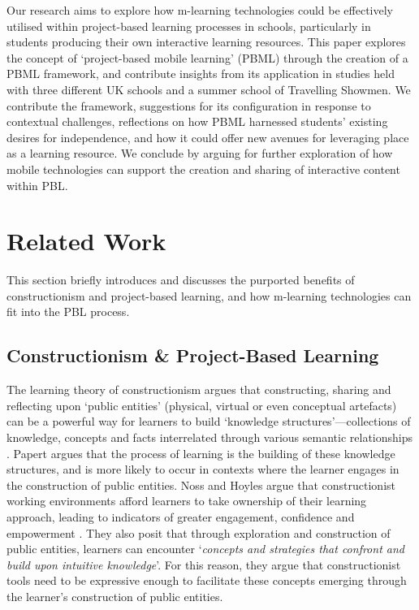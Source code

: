 \documentclass[,hyphens]{sigchi}
\begin{document}
Our research aims to explore how m-learning technologies could be effectively utilised within project-based learning processes in schools, particularly in students producing their own interactive learning resources. This paper explores the concept of `project-based mobile learning' (PBML) through the creation of a PBML framework, and contribute insights from its application in studies held with three different UK schools and a summer school of Travelling Showmen. We contribute the framework, suggestions for its configuration in response to contextual challenges, reflections on how PBML harnessed students' existing desires for independence, and how it could offer new avenues for leveraging place as a learning resource. We conclude by arguing for further exploration of how mobile technologies can support the creation and sharing of interactive content within PBL.

\section{Related Work}

This section briefly introduces and discusses the purported benefits of constructionism and project-based learning, and how m-learning technologies can fit into the PBL process.

\subsection{Constructionism \& Project-Based Learning}
The learning theory of constructionism argues that constructing, sharing and reflecting upon `public entities' (physical, virtual or even conceptual artefacts) can be a powerful way for learners to build `knowledge structures'---collections of knowledge, concepts and facts interrelated through various semantic relationships \cite{PapertSeymourandHarel1991a}. Papert argues that the process of learning is the building of these knowledge structures, and is more likely to occur in contexts where the learner engages in the construction of public entities. Noss and Hoyles argue that constructionist working environments afford learners to take ownership of their learning approach, leading to indicators of greater engagement, confidence and empowerment \cite{Noss2017}. They also posit that through exploration and construction of public entities, learners can encounter `\textit{concepts and strategies that confront and build upon intuitive knowledge}'. For this reason, they argue that constructionist tools need to be expressive enough to facilitate these concepts emerging through the learner's construction of public entities.
\end{document}
